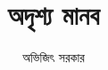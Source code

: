 \documentclass[a4paper,10pt,xelatex]{article}
\begin{document}
\begin{titlepage}
\title{অদৃশ্য মানব}
\author{অভিজিৎ সরকার}
\maketitle
\vspace{-2em}
‌‌
\end{titlepage}




\end{document}
